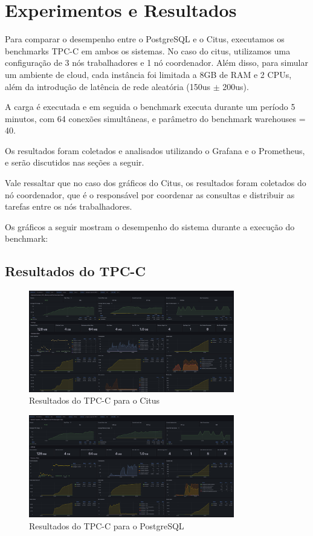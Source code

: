 \section{Experimentos e Resultados}

Para comparar o desempenho entre o PostgreSQL e o Citus, executamos os benchmarks TPC-C em ambos os sistemas.
No caso do citus, utilizamos uma configuração de 3 nós trabalhadores e 1 nó coordenador. Além disso, para simular um ambiente de cloud, cada instância foi limitada a 8GB de RAM e 2 CPUs,
além da introdução de latência de rede aleatória (150us $\pm$ 200us). 

A carga é executada e em seguida o benchmark executa durante um período 5 minutos, 
com 64 conexões simultâneas, e parâmetro do benchmark warehouses = 40.

Os resultados foram coletados e analisados utilizando o Grafana e o Prometheus,
e serão discutidos nas seções a seguir.

Vale ressaltar que no caso dos gráficos do Citus, os resultados foram coletados do nó coordenador,
que é o responsável por coordenar as consultas e distribuir as tarefas entre os nós trabalhadores. 

Os gráficos a seguir mostram o desempenho do sistema durante a execução do benchmark:
\subsection{Resultados do TPC-C}
\begin{figure}[H]
	\centering
	\includegraphics[width=0.8\textwidth]{imgs/citus.jpg}
	\caption{Resultados do TPC-C para o Citus}
	\label{fig:tpc-c}
\end{figure}

\begin{figure}[H]
	\centering
	\includegraphics[width=0.8\textwidth]{imgs/Postgres.jpg}
	\caption{Resultados do TPC-C para o PostgreSQL}
	\label{fig:tpc-c}
\end{figure}

